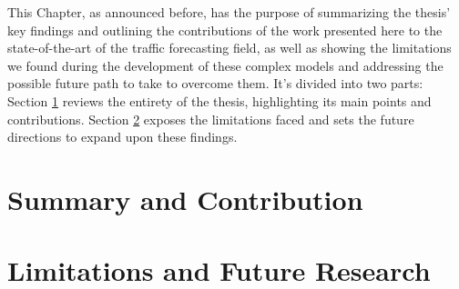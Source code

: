 This Chapter, as announced before, has the purpose of summarizing the thesis' key findings and outlining the contributions of the work presented here to the state-of-the-art of the traffic forecasting field, as well as showing the limitations we found during the development of these complex models and addressing the possible future path to take to overcome them. It's divided into two parts: Section \ref{sec:summary} reviews the entirety of the thesis, highlighting its main points and contributions. Section \ref{sec:limitations_future} exposes the limitations faced and sets the future directions to expand upon these findings.

\section{Summary and Contribution} \label{sec:summary}



\section{Limitations and Future Research} \label{sec:limitations_future}